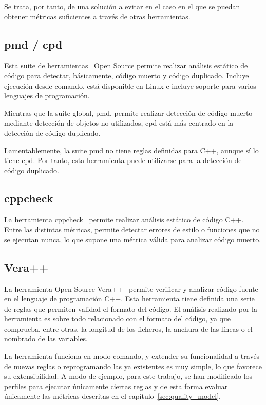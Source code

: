 \documentclass[11pt]{article}
\begin{document}
Se trata, por tanto, de una solución a evitar en el caso en el que se puedan obtener métricas suficientes a través de otras herramientas.

\subsection{pmd / cpd}

Esta suite de herramientas~\cite{metrictools:pmdcpd} Open Source permite realizar análisis estático de código para detectar, básicamente, código muerto y código duplicado. Incluye ejecución desde comando, está disponible en Linux e incluye soporte para varios lenguajes de programación.

Mientras que la suite global, pmd, permite realizar detección de código muerto mediante detección de objetos no utilizados, cpd está más centrado en la detección de código duplicado.

Lamentablemente, la suite pmd no tiene reglas definidas para C++, aunque sí lo tiene cpd. Por tanto, esta herramienta puede utilizarse para la detección de código duplicado.

\subsection{cppcheck}

La herramienta cppcheck~\cite{metrictools:cppcheck} permite realizar análisis estático de código C++. Entre las distintas métricas, permite detectar errores de estilo o funciones que no se ejecutan nunca, lo que supone una métrica válida para analizar código muerto.

\subsection{Vera++}

La herramienta Open Source Vera++~\cite{metrictools:veraplusplus} permite verificar y analizar código fuente en el lenguaje de programación C++. Esta herramienta tiene definida una serie de reglas que permiten validad el formato del código. El análisis realizado por la herramienta es sobre todo relacionado con el formato del código, ya que comprueba, entre otras, la longitud de los ficheros, la anchura de las líneas o el nombrado de las variables.

La herramienta funciona en modo comando, y extender su funcionalidad a través de nuevas reglas o reprogramando las ya existentes es muy simple, lo que favorece su extensibilidad. A modo de ejemplo, para este trabajo, se han modificado los perfiles para ejecutar únicamente ciertas reglas y de esta forma evaluar únicamente las métricas descritas en el capítulo~\ref{sec:quality_model}.
\end{document}
